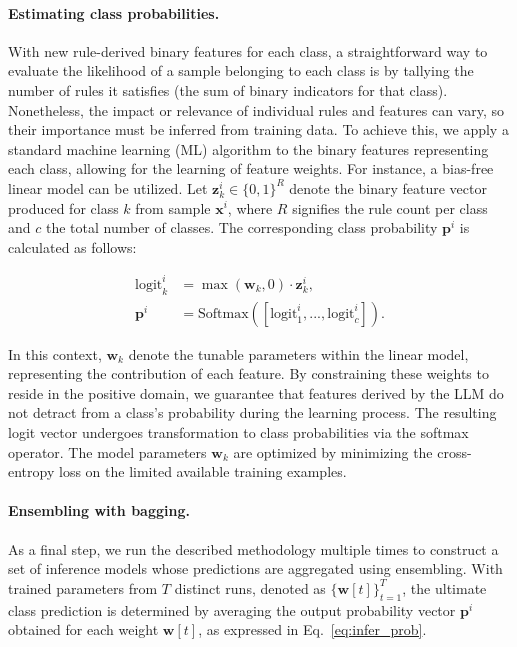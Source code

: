 \paragraph{Estimating class probabilities.} With new rule-derived binary features for each class, a straightforward way to evaluate the likelihood of a sample belonging to each class is by tallying the number of rules it satisfies (the sum of binary indicators for that class). Nonetheless, the impact or relevance of individual rules and features can vary, so their importance must be inferred from training data. To achieve this, we apply a standard machine learning (ML) algorithm to the binary features representing each class, allowing for the learning of feature weights. For instance, a bias-free linear model can be utilized. Let $\mathbf{z}_k^i \in \{0, 1\}^R$ denote the binary feature vector produced for class $k$ from sample $\mathbf{x}^i$, where $R$ signifies the rule count per class and $c$ the total number of classes. The corresponding class probability $\mathbf{p}^i$ is calculated as follows:

\begin{align}
\text{logit}_k^i &= \max(\mathbf{w}_k, 0) \cdot \mathbf{z}_k^i, \nonumber \\
\mathbf{p}^i &= \text{Softmax}({[\text{logit}_{1}^i, ..., \text{logit}_{c}^i]}). \label{eq:infer_prob}
\end{align}

In this context, $\mathbf{w}_k$ denote the tunable parameters within the linear model, representing the contribution of each feature. By constraining these weights to reside in the positive domain, we guarantee that features derived by the LLM do not detract from a class's probability during the learning process. The resulting logit vector undergoes transformation to class probabilities via the softmax operator. The model parameters $\mathbf{w}_k$ are optimized by minimizing the cross-entropy loss on the limited available training examples.

\vspace*{-0.12in}
\paragraph{Ensembling with bagging.} As a final step, we run the described methodology multiple times to construct a set of inference models whose predictions are aggregated using ensembling. With trained parameters from $T$ distinct runs, denoted as $\{\mathbf{w}[t]\}_{t=1}^T$, the ultimate class prediction is determined by averaging the output probability vector $\mathbf{p}^i$ obtained for each weight $\mathbf{w}[t]$, as expressed in Eq.~\ref{eq:infer_prob}.

